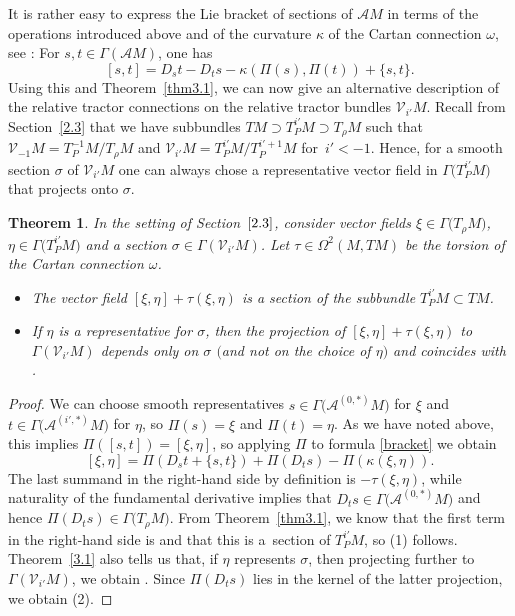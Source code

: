 \documentclass[pdftex]{sigma}
\numberwithin{equation}{section}
\newtheorem{Theorem}{Theorem}[section]
\def\Cal{\mathcal}
\newcommand{\ka}{\kappa}
\newcommand{\om}{\omega}
\newcommand{\si}{\sigma}
\newcommand{\Ga}{\Gamma}
\newcommand{\Om}{\Omega}
\begin{document}
It is rather easy to express the Lie bracket of sections of $\Cal AM$ in terms of the
operations introduced above and of the curvature $\ka$ of the Cartan connection $\om$,
see \cite[Corollary 1.5.8]{book}: For $s,t\in\Ga(\Cal AM)$, one has
\begin{equation}\label{bracket}
[s,t]=D_st-D_ts-\ka(\Pi(s),\Pi(t))+\{s,t\}.
\end{equation}
Using this and Theorem~\ref{thm3.1}, we can now give an alternative description of
the relative tractor connections on the relative tractor bundles $\Cal
V_{i'}M$. Recall from Section~\ref{2.3} that we have subbundles $TM\supset
T^{i'}_PM\supset T_\rho M$ such that $\Cal V_{-1}M=T^{-1}_P M/T_\rho M$ and $\Cal
V_{i'}M=T^{i'}_PM/T^{i'+1}_PM$ for~${i'<-1}$. Hence, for a smooth section $\si$ of $\Cal
V_{i'}M$ one can always chose a representative vector field in $\Ga\bigl(T^{i'}_PM\bigr)$ that
projects onto $\si$.

\begin{Theorem}\label{thm3.2.1}
In the setting of Section~$\ref{2.3}$, consider vector fields $\xi\in\Ga\bigl(T_\rho M\bigr)$,
$\eta\in\Ga\bigl(T^{i'}_PM\bigr)$ and a section $\si\in\Ga(\Cal V_{i'}M)$. Let
$\tau\in\Om^2(M,TM)$ be the torsion of the Cartan connection $\om$.
\begin{itemize}\itemsep=0pt
\item[$(1)$] The vector field $[\xi,\eta]+\tau(\xi,\eta)$ is a section of the subbundle
$T^{i'}_PM\subset TM$.

\item[$(2)$] If $\eta$ is a representative for $\si$, then the projection of
$[\xi,\eta]+\tau(\xi,\eta)$ to $\Ga(\Cal V_{i'}M)$ depends only on $\si$ $($and not on
the choice of $\eta)$ and coincides with \smash{$\nabla^{\rho,\Cal V_{i'}}_\xi\si$}.
\end{itemize}
\end{Theorem}
\begin{proof}
We can choose smooth representatives $s\in\Ga\bigl(\Cal A^{(0,*)}M\bigr)$ for $\xi$ and
$t\in\Ga\bigl(\Cal A^{(i',*)}M\bigr)$ for $\eta$, so $\Pi(s)=\xi$ and $\Pi(t)=\eta$. As we have
noted above, this implies $\Pi([s,t])=[\xi,\eta]$, so applying $\Pi$ to formula
\eqref{bracket} we obtain
\[
[\xi,\eta]=\Pi(D_st+\{s,t\})+\Pi(D_ts)-\Pi(\ka(\xi,\eta)).
\]
The last summand in the right-hand side by definition is $-\tau(\xi,\eta)$, while
naturality of the fundamental derivative implies that $D_t s\in\Ga\bigl(\Cal A^{(0,*)}M\bigr)$
and hence $\Pi(D_ts)\in\Ga\bigl(T_\rho M\bigr)$. From Theorem~\ref{thm3.1}, we know that the
first term in the right-hand side is \smash{$\Pi\bigl(\nabla^{\Cal AM}_\xi t\bigr)$} and that this is a~section
of $T^{i'}_PM$, so (1) follows. Theorem~\ref{3.1} also tells us that, if
$\eta$ represents $\si$, then projecting \smash{$\Pi\bigl(\nabla^{\Cal AM}_\xi t\bigr)$} further to
$\Ga(\Cal V_{i'}M)$, we obtain \smash{$\nabla^{\rho,\Cal V_{i'}}_\xi\si$}. Since $\Pi(D_ts)$
lies in the kernel of the latter projection, we obtain (2).
\end{proof}
\end{document}
